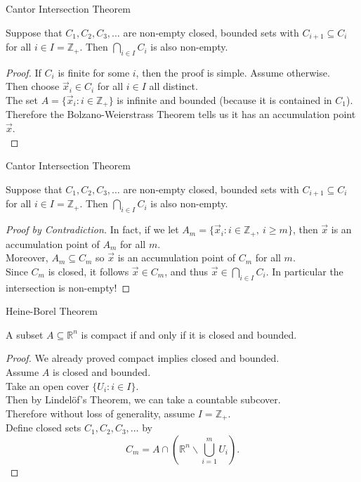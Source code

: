 \documentclass{beamer}
\begin{document}
\begin{frame}{Cantor Intersection Theorem}
\begin{thm}
Suppose that $C_1,C_2,C_3,\dots$ are non-empty closed, bounded sets with $C_{i+1}\subseteq C_i$ for all $i\in I = \mathbb{Z}_+$.
Then $\bigcap_{i\in I} C_i$ is also non-empty.
\end{thm}
\begin{proof}
If $C_i$ is finite for some $i$, then the proof is simple. Assume otherwise.\\
Then choose $\vec x_i\in C_i$ for all $i\in I$ all distinct.\\
The set $A = \{\vec x_i: i\in \mathbb{Z}_+\}$ is infinite and bounded (because it is contained in $C_1$).\\
Therefore the Bolzano-Weierstrass Theorem tells us it has an accumulation point $\vec x$.\\
\end{proof}
\end{frame}

\begin{frame}{Cantor Intersection Theorem}
\begin{thm}
Suppose that $C_1,C_2,C_3,\dots$ are non-empty closed, bounded sets with $C_{i+1}\subseteq C_i$ for all $i\in I = \mathbb{Z}_+$.
Then $\bigcap_{i\in I} C_i$ is also non-empty.
\end{thm}
\begin{proof}[Proof by Contradiction]
In fact, if we let $A_m = \{\vec x_i: i\in \mathbb{Z}_+,\ i\geq m\}$, then $\vec x$ is an accumulation point of $A_m$ for all $m$.\\
Moreover, $A_m\subseteq C_m$ so $\vec x$ is an accumulation point of $C_m$ for all $m$.\\
Since $C_m$ is closed, it follows $\vec x\in C_m$, and thus $\vec x\in \bigcap_{i\in I} C_i$.
In particular the intersection is non-empty!
\end{proof}
\end{frame}

\begin{frame}{Heine-Borel Theorem}
\begin{thm}
A subset $A\subseteq\mathbb{R}^n$ is compact if and only if it is closed and bounded.
\end{thm}
\begin{proof}
We already proved compact implies closed and bounded.\\
Assume $A$ is closed and bounded.\\
Take an open cover $\{U_i: i\in I\}$.\\
Then by Lindel\"{o}f's Theorem, we can take a countable subcover.\\
Therefore without loss of generality, assume $I=\mathbb{Z}_+$.\\
Define closed sets $C_1,C_2,C_3,\dots$ by
$$C_m = A\cap \left(\mathbb{R}^n\backslash \bigcup_{i=1}^m U_i\right).$$
\end{proof}
\end{frame}
\end{document}
